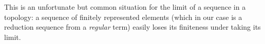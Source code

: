   This is an unfortunate but common situation for the limit of a sequence in a topology:
  a sequence of finitely represented elements
  (which in our case is a reduction sequence from a \emph{regular} term)
  easily loses its finiteness under taking its limit.


%
%
%
%
%
%

